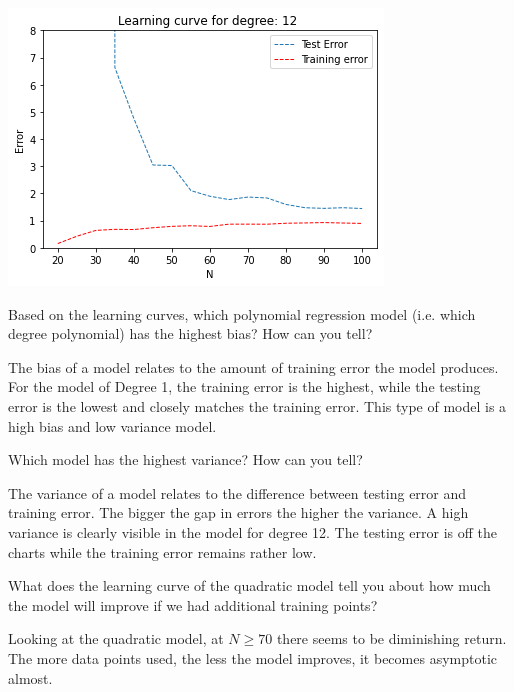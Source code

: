 \begin{solution}
\includegraphics[scale =.5]{set1/images/LCD12.png}\newline
    
  \end{solution}

\begin{problem}[3]
  Based on the learning curves, which polynomial regression model (i.e. which degree polynomial) has the highest bias? How can you tell?
\end{problem}
\begin{solution}
The bias of a model relates to the amount of training error the model produces. For the model of Degree 1, the training error is the highest, while the testing error is the lowest and closely matches the training error. This type of model is a high bias and low variance model.
\end{solution}

\begin{problem}[3]
  Which model has the highest variance? How can you tell?
\end{problem}
\begin{solution}
  The variance of a model relates to the difference between testing error and training error. The bigger the gap in errors the higher the variance. A high variance is clearly visible in the model for degree 12. The testing error is off the charts while the training error remains rather low. 
\end{solution}

\begin{problem}[3]
  What does the learning curve of the quadratic model tell you about how much the model will improve if we had additional training points?
\end{problem}
\begin{solution}
Looking at the quadratic model, at $N \geq 70$ there seems to be diminishing return. The more data points used, the less the model improves, it becomes asymptotic almost. 
\end{solution}


